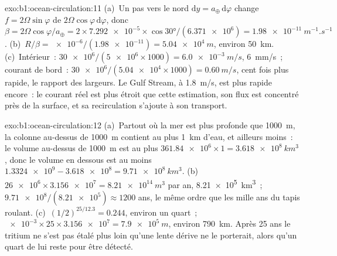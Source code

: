 \begin{solution}{exo:b1:ocean-circulation:11}
(a)~Un pas vers le nord $\mathrm dy = a_\oplus\,\mathrm d\varphi$ change $f = 2\Omega
\sin\varphi$ de $2\Omega\cos\varphi\,\mathrm d\varphi$, donc $\beta = 2\Omega
\cos\varphi/a_\oplus = 2 \times \num{7.292e-5} \times \cos\ang{30}/(\num{6.371e6}) =
\qty{1.98e-11}{m^{-1}.s^{-1}}$. (b)~$R/\beta = \num{e-6}/(\num{1.98e-11}) =
\qty{5.04e4}{m}$, environ \qty{50}{km}. (c)~Intérieur~: $\num{30e6}/(\num{5e6} \times
1000) = \qty{6.0e-3}{m/s}$, \qty{6}{mm/s}~; courant de bord~: $\num{30e6}/(\num{5.04e4}
\times 1000) = \qty{0.60}{m/s}$, cent fois plus rapide, le rapport des largeurs. Le
Gulf Stream, à \qty{1.8}{m/s}, est plus rapide encore~: le courant réel est plus étroit que
cette estimation, son flux est concentré près de la surface, et sa recirculation s'ajoute
à son transport.
\end{solution}

\begin{solution}{exo:b1:ocean-circulation:12}
(a)~Partout où la mer est plus profonde que \qty{1000}{m}, la colonne au-dessus de \qty{1000}{m}
contient au plus \qty{1}{km} d'eau, et ailleurs moins~: le volume au-dessus de
\qty{1000}{m} est au plus $\num{361.84e6} \times 1 = \qty{3.618e8}{km^3}$, donc le
volume en dessous est au moins $\num{1.3324e9} - \num{3.618e8} = \qty{9.71e8}{km^3}$.
(b)~$\num{26e6} \times \num{3.156e7} = \qty{8.21e14}{m^3}$ par an,
\qty{8.21e5}{km^3}~; $\num{9.71e8}/(\num{8.21e5}) \approx 1200$ ans, le même ordre que
les mille ans du tapis roulant. (c)~$(1/2)^{25/12.3} = 0.244$, environ un quart~;
$\num{e-3} \times 25 \times \num{3.156e7} = \qty{7.9e5}{m}$, environ \qty{790}{km}.
Après 25 ans le tritium ne s'est pas étalé plus loin qu'une lente dérive ne le porterait,
alors qu'un quart de lui reste pour être détecté.
\end{solution}

